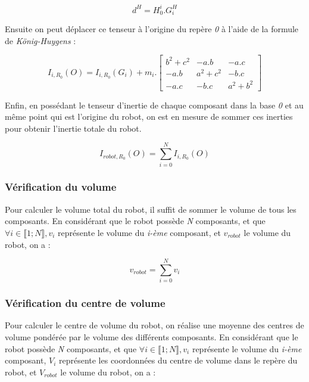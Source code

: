 				\begin{equation}
					d^H = H_0^i . G_i^H
				\end{equation}

				Ensuite on peut déplacer ce tenseur à l'origine du repère \textit{0} à l'aide de la formule de \textit{König-Huygens} :

				\begin{equation}
					I_{i, R_0}(O) = I_{i, R_0}(G_i) + m_i.\begin{bmatrix} b^2 + c^2 & -a.b & -a.c \\ -a.b & a^2 + c^2 & -b.c \\ -a.c & -b.c & a^2 + b^2 \end{bmatrix}
				\end{equation}

				Enfin, en possédant le tenseur d'inertie de chaque composant dans la base \textit{0} et au même point qui est l'origine du robot, on est en mesure de sommer ces inerties pour obtenir l'inertie totale du robot.

				\begin{equation}
					I_{robot, R_0}(O) = \sum_{i=0}^N I_{i, R_0}(O)
				\end{equation}

			\subsubsection{Vérification du volume}

				Pour calculer le volume total du robot, il suffit de sommer le volume de tous les composants. En considérant que le robot possède \textit{N} composants, et que $\forall i \in \llbracket 1; N \rrbracket, v_i$ représente le volume du \textit{i-ème} composant, et $v_{robot}$ le volume du robot, on a :

				\begin{equation}
					v_{robot} = \sum_{i=0}^{N}v_i
				\end{equation}

			\subsubsection{Vérification du centre de volume}

				Pour calculer le centre de volume du robot, on réalise une moyenne des centres de volume pondérée par le volume des différents composants. En considérant que le robot possède \textit{N} composants, et que $\forall i \in \llbracket 1; N \rrbracket, v_i$ représente le volume du \textit{i-ème} composant, $V_i$ représente les coordonnées du centre de volume dans le repère du robot, et $V_{robot}$ le volume du robot, on a :

